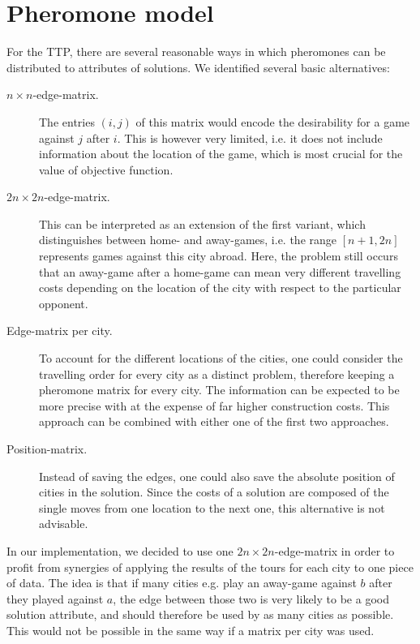 \section{Pheromone model}

For the TTP, there are several reasonable ways in which pheromones can be distributed to attributes of solutions. We identified several basic alternatives:

\begin{description}
	\item[$n\times n$-edge-matrix.] 
		The entries $(i,j)$ of this matrix would encode the desirability for a game against $j$ after $i$. This is however very limited, i.e. it does not include information about the location of the game, which is most crucial for the value of objective function.
	\item[$2n\times 2n$-edge-matrix.] 
		This can be interpreted as an extension of the first variant, which distinguishes between home- and away-games, i.e. the range $[n+1, 2n]$ represents games against this city abroad. 
		Here, the problem still occurs that an away-game after a home-game can mean very different travelling costs depending on the location of the city with respect to the particular opponent.
		
	\item[Edge-matrix per city.]
		To account for the different locations of the cities, one could consider the travelling order for every city as a distinct problem, therefore keeping a pheromone matrix for every city.
		The information can be expected to be more precise with at the expense of far higher construction costs.
		This approach can be combined with either one of the first two approaches.

	\item[Position-matrix.]
		Instead of saving the edges, one could also save the absolute position of cities in the solution. Since the costs of a solution are composed of the single moves from one location to the next one, this alternative is not advisable. 
\end{description}

In our implementation, we decided to use one $2n\times 2n$-edge-matrix in order to profit from synergies of applying the results of the tours for each city to one piece of data.
The idea is that if many cities e.g. play an away-game against $b$ after they played against $a$, the edge between those two is very likely to be a good solution attribute, and should therefore be used by as many cities as possible. 
This would not be possible in the same way if a matrix per city was used.

	

